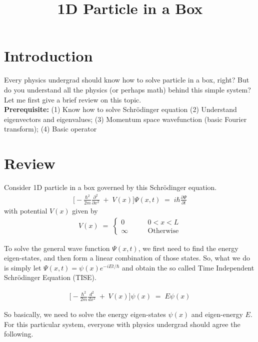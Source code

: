 \documentclass[12pt,a4paper]{article}
\begin{document}
\title{ \vspace{-2cm} 1D Particle in a Box}
\date{}
\maketitle

\section{Introduction}

Every physics undergrad should know how to solve particle in a box, right? But do you understand all the physics (or perhaps math) behind this simple system? Let me first give a brief review on this topic.\\

\textbf{Prerequisite:} (1) Know how to solve Schr\"{o}dinger equation (2) Understand eigenvectors and eigenvalues; (3) Momentum space wavefunction (basic Fourier transform); (4) Basic operator

\section{Review}
Consider 1D particle in a box governed by this Schr\"{o}dinger equation.
\begin{align}
	\Bigg[ -\frac{\hbar^{2}}{2m} \frac{\partial^{2}}{\partial x^{2}} \; + \; V(x) \Bigg] \Psi(x, t)
	\; = \;
	i \hbar \frac{\partial \Psi}{\partial t}
\end{align}
with potential $V(x)$ given by
\begin{align}
	V(x) \; = \; 
	\begin{cases}
	0  & \qquad 0 < x < L \\
	\infty & \qquad \mathrm{Otherwise}
	\end{cases}
\end{align}

To solve the general wave function $\Psi(x, t)$, we first need to find the energy eigen-states, and then form a linear combination of those states. So, what we do is simply let $\Psi(x, t) = \psi(x) e^{-i E t / \hbar }$ and obtain the so called Time Independent Schr\"{o}dinger Equation (TISE).

\begin{align}
	\Bigg[ -\frac{\hbar^{2}}{2m} \frac{d^{2}}{d x^{2}} \; + \; V(x) \Bigg] \psi(x)
	\; = \;
	E \psi(x)
\end{align}

So basically, we need to solve the energy eigen-states $\psi(x)$ and eigen-energy $E$. For this particular system, everyone with physics undergrad should agree the following.
\end{document}
